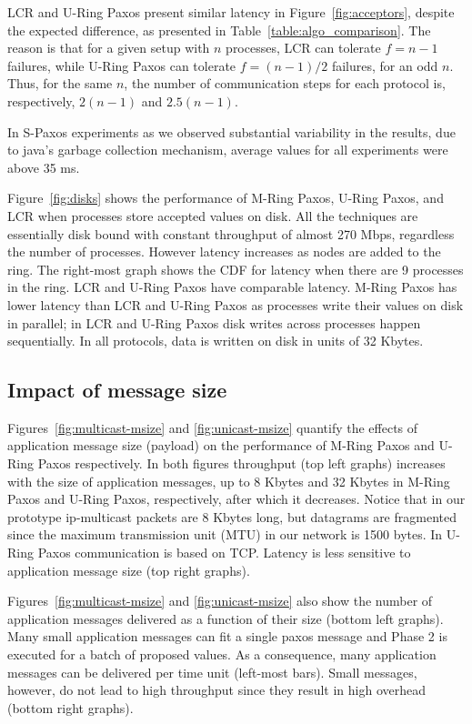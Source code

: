 \documentclass[final,3p,times,twocolumn,authoryear]{elsarticle}
\begin{document}
LCR and U-Ring Paxos present similar latency in Figure~\ref{fig:acceptors}, despite the expected difference, as presented in Table~\ref{table:algo_comparison}. The reason is that for a given setup with $n$ processes, LCR can tolerate $f=n-1$ failures, while U-Ring Paxos can tolerate $f=(n-1)/2$ failures, for an odd $n$. Thus, for the same $n$, the number of communication steps for each protocol is, respectively, $2(n-1)$ and $2.5(n-1)$.

In S-Paxos experiments as we observed substantial variability in the results, due to java's garbage collection mechanism, average values for all experiments were above 35 ms. 


Figure~\ref{fig:disks} shows the performance of M-Ring Paxos, U-Ring Paxos, and LCR when processes store accepted values on disk. All the techniques are essentially disk bound with constant throughput of almost 270 Mbps, regardless the number of processes. However latency increases as nodes are added to the ring. The right-most graph shows the CDF for latency when there are 9 processes in the ring. 
LCR and U-Ring Paxos have comparable latency. M-Ring Paxos has lower latency than LCR and U-Ring Paxos as processes write their values on disk in parallel; in LCR and U-Ring Paxos disk writes across processes happen sequentially. 
In all protocols, data is written on disk in units of 32 Kbytes.

\subsection{Impact of message size}
\label{subsec:msgsize}

Figures~\ref{fig:multicast-msize} and \ref{fig:unicast-msize} quantify the effects of application message size (payload) on the performance of M-Ring Paxos and U-Ring Paxos respectively. In both figures throughput (top left graphs) increases with the size of application messages, up to 8 Kbytes and 32 Kbytes in M-Ring Paxos and U-Ring Paxos, respectively, after which it decreases. Notice that in our prototype ip-multicast packets are 8 Kbytes long, but datagrams are fragmented since the maximum transmission unit (MTU) in our network is 1500 bytes. In U-Ring Paxos communication is based on TCP. Latency is less sensitive to application message size (top right graphs). 

Figures~\ref{fig:multicast-msize} and \ref{fig:unicast-msize} also show the number of application messages delivered as a function of their size (bottom left graphs). Many small application messages can fit a single paxos message and Phase 2 is executed for a batch of proposed values. As a consequence, many application messages can be delivered per time unit (left-most bars). Small messages, however, do not lead to high throughput since they result in high overhead (bottom right graphs). 
\end{document}
